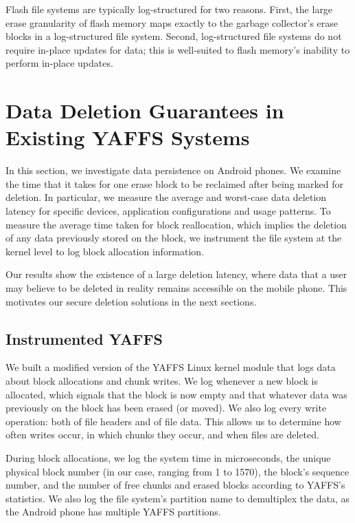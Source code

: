\documentclass{acmtog}
\begin{document}
Flash file systems are typically log-structured for two
reasons. First, the large erase granularity of flash memory maps exactly to
the garbage collector's erase blocks in a log-structured file system. Second,
log-structured file systems do not require in-place updates for data; this
is well-suited to flash memory's inability to perform in-place updates.









\section{Data Deletion Guarantees in \\Existing YAFFS Systems}

In this section, we investigate data persistence on Android
phones.
We examine the time that it takes for one erase block to be
reclaimed after being marked for deletion. In particular,
we measure the average
and worst-case data deletion latency for specific
devices, application configurations and usage patterns. 
To measure the average time taken
for block reallocation, which implies the deletion of any
data previously stored on the block, we instrument the file system at the
kernel level to log block allocation information. 

Our results show the existence of a large deletion latency, where data that a
user may believe to be deleted in reality remains accessible on the mobile
phone. This motivates our secure deletion solutions in the next sections.

\subsection{Instrumented YAFFS}
We built a modified version of the YAFFS Linux kernel module that logs
data about block allocations and chunk writes.  We log whenever a new
block is allocated, which signals that the block is now empty and
that whatever data was previously on the block has been erased (or
moved). We also log every write operation: both of file headers and
of file data. This allows us to determine how often writes occur, in
which chunks they occur, and when files are deleted.

During block allocations, we log the system time in microseconds, the
unique physical block number (in our case, ranging from 1 to
1570), the block's sequence number, and the number of free chunks
and erased blocks according to YAFFS's statistics. We also log the
file system's partition name to demultiplex the data, as the Android phone has multiple YAFFS
partitions.
\end{document}
